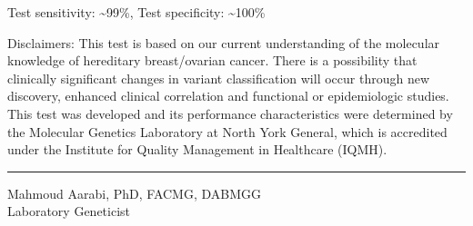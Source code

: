 \documentclass[10pt]{article}
\begin{document}
{Test sensitivity: \textasciitilde 99\%, Test specificity: \textasciitilde 100\%

Disclaimers:  This test is based on our current understanding of the molecular knowledge of hereditary breast/ovarian cancer. There is a possibility that clinically significant changes in variant classification will occur through new discovery, enhanced clinical correlation and functional or epidemiologic studies. This test was developed and its performance characteristics were determined by the Molecular Genetics Laboratory at North York General, which is accredited under the Institute for Quality Management in Healthcare (IQMH).
}

\vspace{4em}
\hfill \parbox{7cm}{
\rule{7cm}{1pt}
\small
Mahmoud Aarabi, PhD, FACMG, DABMGG \\
Laboratory Geneticist
}
\end{document}
